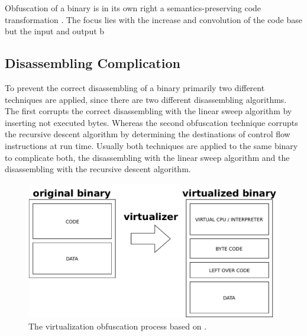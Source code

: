 \documentclass[10pt,twoside,a4paper,bibliography=totoc]{scrbook}
\begin{document}
Obfuscation of a binary is in its own right a semantics-preserving code transformation \cite{DBLP:conf/sp/YadegariJWD15}. The focus lies with the increase and convolution of the code base but the input and output b
\subsection{Disassembling Complication}
\label{sec2:disobfu}

To prevent the correct disassembling of a binary primarily two different techniques 
are applied, since there are two different disassembling algorithms.
The first corrupts the correct disassembling with the linear sweep algorithm by
inserting not executed bytes.
Whereas the second obfuscation technique corrupts the recursive descent algorithm 
by determining the destinations of control flow instructions at run time.
Usually both techniques are applied to the same binary to complicate both,
the disassembling with the linear sweep algorithm and the disassembling with 
the recursive descent algorithm.

\begin{figure}[htp]
\centering
\includegraphics[scale=0.8]{images/ch2/virtualization_process.pdf} 
\caption{The virtualization obfuscation process based on \cite{symantec_clampi}. }
\label{virtualization_process}
\end{figure}
\end{document}
